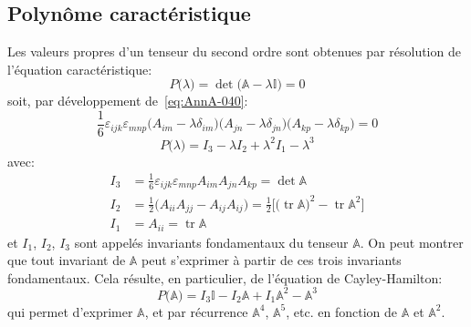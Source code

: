 \subsection{Polynôme caractéristique}
Les valeurs propres d'un tenseur du second ordre sont obtenues par résolution de l'équation caractéristique:
\begin{equation}
    P\bigl( \lambda \bigr) = \det \bigl( \mathbb{A} - \lambda \mathbb{I} \bigr) = 0
    \label{eq:AnnA-042}
\end{equation}
soit, par développement de~\eqref{eq:AnnA-040}:
\begin{displaymath}
    \frac{1}{6} \varepsilon_{ijk} \varepsilon_{mnp} \bigl( A_{im} -\lambda \delta_{im} \bigr) \bigl( A_{jn} - \lambda \delta_{jn} \bigr) \bigl( A_{kp} - \lambda \delta_{kp} \bigr) = 0
\end{displaymath}
\begin{equation}
    P\bigl( \lambda \bigr) = I_3 -\lambda I_2 + \lambda^{2} I_1 - \lambda^3
    \label{eq:AnnA-043}
\end{equation}
avec:
\begin{equation}
    \begin{aligned}
        I_3 &= \frac{1}{6} \varepsilon_{ijk} \varepsilon_{mnp} A_{im} A_{jn} A_{kp} = \det \mathbb{A} \\
        I_2 &= \frac{1}{2} \bigl( A_{ii} A_{jj} - A_{ij} A_{ij} \bigr) = \frac{1}{2} \bigl[ \bigl( \operatorname{tr} \mathbb{A} \bigr)^2 - \operatorname{tr} \mathbb{A}^2 \bigr] \\
        I_1 &= A_{ii} = \operatorname{tr} \mathbb{A}
    \end{aligned}
    \label{eq:AnnA-044}
\end{equation}
et $I_1$, $I_2$, $I_3$ sont appelés invariants fondamentaux du tenseur $\mathbb{A}$.
On peut montrer que tout invariant de $\mathbb{A}$ peut s'exprimer à partir de ces trois invariants fondamentaux.
Cela résulte, en particulier, de l'équation de Cayley-Hamilton:
\begin{equation}
    P\bigl( \mathbb{A} \bigr) = I_3 \mathbb{I} - I_2 \mathbb{A} + I_1 \mathbb{A}^2 - \mathbb{A}^3
    \label{eq:AnnA-045}
\end{equation}
qui permet d'exprimer $\mathbb{A}$, et par récurrence $\mathbb{A}^4$, $\mathbb{A}^5$, etc. en fonction de $\mathbb{A}$ et $\mathbb{A}^2$.

